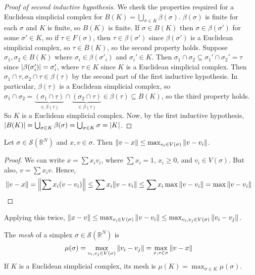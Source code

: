 \begin{proof}[Proof of second inductive hypothesis]
	We check the properties required for a Euclidean simplicial complex for \( B(K) = \bigcup_{\sigma \in K} \beta(\sigma) \).
	\( \beta(\sigma) \) is finite for each \( \sigma \) and \( K \) is finite, so \( B(K) \) is finite.
	If \( \sigma \in B(K) \) then \( \sigma \in \beta(\sigma') \) for some \( \sigma' \in K \), so if \( \tau \in F(\sigma) \), then \( \tau \in \beta(\sigma') \) since \( \beta(\sigma') \) is a Euclidean simplicial complex, so \( \tau \in B(K) \), so the second property holds.
	Suppose \( \sigma_1, \sigma_2 \in B(K) \) where \( \sigma_i \in \beta(\sigma'_i) \) and \( \sigma_i' \in K \).
	Then \( \sigma_1 \cap \sigma_2 \subseteq \sigma_1' \cap \sigma_2' = \tau \) since \( \abs{\beta(\sigma'_i)} = \sigma'_i \), where \( \tau \in K \) since \( K \) is a Euclidean simplicial complex.
	Then \( \sigma_1 \cap \tau, \sigma_2 \cap \tau \in \beta(\tau) \) by the second part of the first inductive hypothesis.
	In particular, \( \beta(\tau) \) is a Euclidean simplicial complex, so \( \sigma_1 \cap \sigma_2 = \underbrace{(\sigma_1 \cap \tau)}_{\in \beta(\tau)} \cap \underbrace{(\sigma_2 \cap \tau)}_{\in \beta(\tau)} \in \beta(\tau) \subseteq B(K) \), so the third property holds.
	So \( K \) is a Euclidean simplicial complex.
	Now, by the first inductive hypothesis, \( \abs{B(K)} = \bigcup_{\sigma \in K} \beta(\sigma) = \bigcup_{\sigma \in K} \sigma = \abs{K} \).
\end{proof}
\begin{lemma}
	Let \( \sigma \in \mathcal S(\mathbb R^N) \) and \( x, v \in \sigma \).
	Then \( \norm{v - x} \leq \max_{v_i \in V(\sigma)} \norm{v - v_i} \).
\end{lemma}
\begin{proof}
	We can write \( x = \sum x_i v_i \), where \( \sum x_i = 1 \), \( x_i \geq 0 \), and \( v_i \in V(\sigma) \).
	But also, \( v = \sum x_i v \).
	Hence,
	\[ \norm{v - x} = \norm{\sum x_i (v - v_i)} \leq \sum x_i \norm{v - v_i} \leq \sum x_i \max\norm{v - v_i} = \max \norm{v - v_i} \]
\end{proof}
Applying this twice, \( \norm{x - v} \leq \max_{v_i \in V(\sigma)} \norm{v - v_i} \leq \max_{v_i, v_j \in V(\sigma)} \norm{v_i - v_j} \).
\begin{definition}
	The \emph{mesh} of a simplex \( \sigma \in \mathcal S(\mathbb R^N) \) is
	\[ \mu(\sigma) = \max_{v_i, v_j \in V(\sigma)} \norm{v_i - v_j} = \max_{x, v \in \sigma} \norm{v - x} \]
	If \( K \) is a Euclidean simplicial complex, its mesh is \( \mu(K) = \max_{\sigma \in K} \mu(\sigma) \).
\end{definition}
